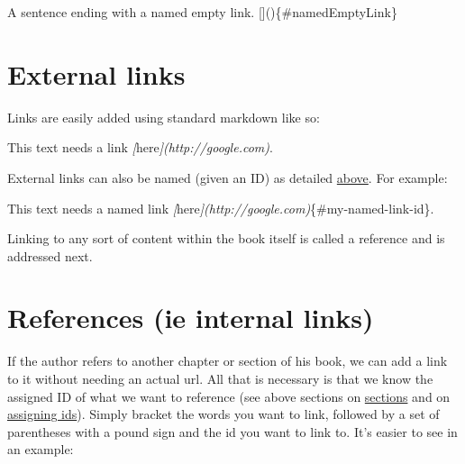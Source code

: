\documentclass[
]{book}
\newenvironment{Shaded}{\begin{snugshade}}{\end{snugshade}}
\newcommand{\CommentTok}[1]{\textcolor[rgb]{0.56,0.35,0.01}{\textit{#1}}}
\newcommand{\NormalTok}[1]{#1}
\newcommand{\OtherTok}[1]{\textcolor[rgb]{0.56,0.35,0.01}{#1}}
\begin{document}
\begin{Shaded}
\begin{Highlighting}[]
\NormalTok{A sentence ending with a named empty link. []()\{\#namedEmptyLink\}}
\end{Highlighting}
\end{Shaded}

\hypertarget{external-links}{%
\section{External links}\label{external-links}}

Links are easily added using standard markdown like so:

\begin{Shaded}
\begin{Highlighting}[]
\NormalTok{This text needs a link }\CommentTok{[}\OtherTok{here}\CommentTok{](http://google.com)}\NormalTok{.}
\end{Highlighting}
\end{Shaded}

External links can also be named (given an ID) as detailed \protect\hyperlink{assigning-ids}{above}. For example:

\begin{Shaded}
\begin{Highlighting}[]
\NormalTok{This text needs a named link }\CommentTok{[}\OtherTok{here}\CommentTok{](http://google.com)}\NormalTok{\{\#my{-}named{-}link{-}id\}.}
\end{Highlighting}
\end{Shaded}

Linking to any sort of content within the book itself is called a reference and is addressed next.

\hypertarget{references}{%
\section{References (ie internal links)}\label{references}}

If the author refers to another chapter or section of his book, we can add a link to it without needing an actual url. All that is necessary is that we know the assigned ID of what we want to reference (see above sections on \protect\hyperlink{chapters-sections-and-more}{sections} and on \protect\hyperlink{assigning-ids}{assigning ids}). Simply bracket the words you want to link, followed by a set of parentheses with a pound sign and the id you want to link to. It's easier to see in an example:
\end{document}
